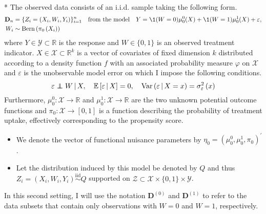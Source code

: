 \begin{boxD}
	\begin{asm}\label{asm:CATE_dgp}\mbox{}\\*
		The observed data consists of an i.i.d. sample taking the following form.
		\begin{equation}\label{DGP2}
			\begin{aligned}
				\mathbf{D}_n & = \{Z_{i} = (X_{i}, W_{i}, Y_{i})\}_{i = 1}^{n}
				\quad \text{from the model} \quad
				Y = \1(W = 0)\mu_{0}^{0}(X) + \1(W = 1)\mu_{0}^{1}(X) + \varepsilon,	\\
				W_{i} & \sim \operatorname{Bern}\left(\pi_{0}\left(X_{i}\right)\right)
			\end{aligned}
		\end{equation}
		where $Y \in \mathcal{Y} \subset \mathbb{R}$ is the response and $W \in \{0,1\}$ is an observed treatment indicator.
		$X \in \mathcal{X} \subset \mathbb{R}^k$ is a vector of covariates of fixed dimension $k$ distributed according to a density function $f$ with an associated probability measure $\varphi$ on $\mathcal{X}$ and $\varepsilon$ is the unobservable model error on which I impose the following conditions.
		\begin{equation}
			\varepsilon \perp\!\!\!\!\perp W \, | \, X, \quad
			\mathbb{E}\left[\varepsilon \, | \, X\right] = 0, \quad
			\text{Var}\left(\varepsilon \, | \, X = x\right) = \sigma_{\varepsilon}^2\left(x\right)
		\end{equation}
		Furthermore, $\mu_{0}^{0}:\mathcal{X} \rightarrow \mathbb{R}$ and $\mu_{0}^{1}:\mathcal{X} \rightarrow \mathbb{R}$ are the two unknown potential outcome functions and $\pi_{0}:\mathcal{X} \rightarrow [0,1]$ is a function describing the probability of treatment uptake, effectively corresponding to the propensity score.
        \begin{itemize}
            \item We denote the vector of functional nuisance parameters by $\eta_{0} = \left(\mu_{0}^{0}, \mu_{0}^{1}, \pi_{0}\right)^{\prime}$.
            \item Let the distribution induced by this model be denoted by $Q$ and thus $Z_{i} = \left(X_{i}, W_{i}, Y_{i}\right) \overset{\text{iid}}{\sim} Q$ supported on $\mathcal{Z} \subset \mathcal{X}\times\{0,1\}\times\mathcal{Y}$.
        \end{itemize}
	\end{asm}
\end{boxD}
In this second setting, I will use the notation $\mathbf{D}^{(0)}$ and $\mathbf{D}^{(1)}$ to refer to the data subsets that contain only observations with $W = 0$ and $W = 1$, respectively.
